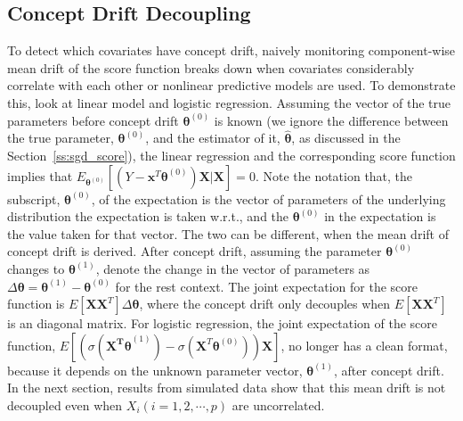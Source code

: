 \documentclass[twoside,11pt]{article}
\begin{document}
\subsection{Concept Drift Decoupling}
\label{ss:diagnosis}
To detect which covariates have concept drift, naively monitoring component-wise mean {drift} of the score function breaks down when {covariates considerably correlate with each other} or nonlinear predictive models are used. To demonstrate this, look at linear model and logistic regression. Assuming the vector of the true parameters {before concept drift $\bm { \theta}^ { (0)}$} is known (we ignore the difference between the true parameter, $\bm { \theta}^ { (0)}$, and the estimator of it, $\hat{\bm { \theta}}$, as discussed in the Section~\ref{ss:sgd_score}), the linear regression and the corresponding score function implies that {$E_{\bm{ \theta}^{ (0)}}[(Y - \bm {x}^T\bm { \theta}^{ (0)} ) \bm {X}|\bm {X}]=0$}. Note the notation that, the subscript, ${ \bm{\theta}}^{ (0)}$, of the expectation is the vector of parameters of the underlying distribution the expectation is taken w.r.t., and the $\bm{ \theta}^{ (0)}$ in the expectation is the value taken for that vector. The two can be different, when the mean drift of concept drift is derived. After concept drift, {assuming the parameter $\bm { \theta}^{ (0)}$ changes to $\bm { \theta} ^{ (1)}$, denote the change in the vector of parameters as $ \Delta \bm { \theta} = \bm { \theta} ^{ (1)} - \bm { \theta}^ { (0)}$ for the rest context.} {The} joint expectation for the score function is $E [\bm {X}\bm {X}^T] \Delta \bm { \theta}$, where the concept drift only decouples when $E [\bm {X}\bm {X}^T]$ is an {diagonal} matrix. For logistic regression, the joint expectation of the score function, $E[(\sigma ( \bm {  \bm {X}^T \theta}^{ (1)}) - \sigma ( \bm {X}^T\bm { \theta}^{ (0)} )) \bm {X}]$,  no longer has a clean format, because it depends on the unknown parameter vector, $\bm { \theta} ^{ (1)}$, after concept drift. In the next section, results from simulated data show that this mean {drift} is not decoupled even when $X _{i} (i = 1,2, \cdots, p)$ are uncorrelated. 
\end{document}
